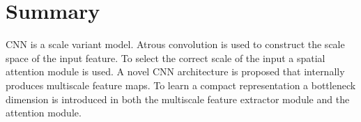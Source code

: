 \section{Summary}

CNN is a scale variant model. Atrous convolution is used to construct the scale space of the input feature. To select the correct scale of the input a spatial attention module is used.  A novel CNN architecture is proposed that internally produces multiscale feature maps. To learn a compact representation a bottleneck dimension is introduced in both the multiscale feature extractor module and the attention module.

